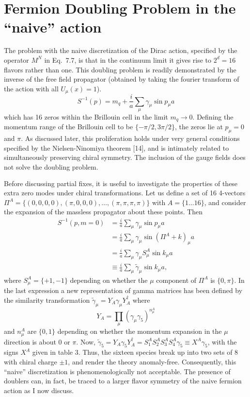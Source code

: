 \chapter{Fermion Doubling Problem in the ``naive'' action}

The problem with the naive discretization of the Dirac action, specified
by the operator $M^N$ in Eq.~7.7, is that in the continuum limit it gives
rise to $2^d = 16$ flavors rather than one. This doubling problem is readily
demonstrated by the inverse of the free field propagator (obtained by taking
the fourier transform of the action with all $U_\mu(x) = 1$).
\begin{equation}
S^{-1}(p) = m_q + \frac{i}{a}\sum_\mu \gamma_\mu \sin p_\mu a
\end{equation}
which has 16 zeros within the Brillouin cell in the limit $m_q \to 0$. Defining
the momentum range of the Brillouin cell to be $\{-\pi/2, 3\pi/2\}$, the zeros
lie at $p_\mu = 0$ and $\pi$. As discussed later, this proliferation holds under very
general conditions specified by the Nielsen-Ninomiya theorem [14], and
is intimately related to simultaneously preserving chiral symmetry. The
inclusion of the gauge fields does not solve the doubling problem.

Before discussing partial fixes, it is useful to investigate the properties
of these extra zero modes under chiral transformations. Let us define a
set of 16 4-vectors $\Pi^A = \{(0, 0, 0, 0), \allowbreak (\pi, 0, 0, 0), \allowbreak \ldots, \allowbreak (\pi, \pi, \pi, \pi)\}$ with
$A = \{1 \ldots 16\}$, and consider the expansion of the massless propagator about
these points. Then
\begin{equation}
\begin{aligned}
S^{-1}(p, m = 0) &= \frac{i}{a}\sum_\mu \gamma_\mu \sin p_\mu a \\
&= \frac{i}{a}\sum_\mu \gamma_\mu \sin(\Pi^A + k)_\mu a \\
&= \frac{i}{a}\sum_\mu \gamma_\mu S_\mu^A \sin k_\mu a \\
&\equiv \frac{i}{a}\sum_\mu \tilde{\gamma}_\mu \sin k_\mu a ,
\end{aligned}
\end{equation}
where $S_\mu^A = \{+1, -1\}$ depending on whether the $\mu$ component of $\Pi^A$ is
$\{0, \pi\}$. In the last expression a new representation of gamma matrices has
been defined by the similarity transformation $\tilde{\gamma}_\mu = Y_A \gamma_\mu Y_A^\dagger$ where
\begin{equation}
Y_A = \prod_\mu (\gamma_\mu \gamma_5)^{n_\mu^A}
\end{equation}
and $n_\mu^A$ are $\{0, 1\}$ depending on whether the momentum expansion in the
$\mu$ direction is about 0 or $\pi$. Now, $\tilde{\gamma}_5 = Y_A \gamma_5 Y_A^\dagger =
S_1^A S_2^A S_3^A S_4^A \gamma_5 \equiv X^A \gamma_5$, with the signs $X^A$ given in table 3.
Thus, the sixteen species break up into two sets of 8 with chiral charge
$\pm 1$, and render the theory anomaly-free. Consequently, this ``naive''
discretization is phenomenologically not acceptable. The presence of
doublers can, in fact, be traced to a larger flavor symmetry of the naive
fermion action as I now discuss.

